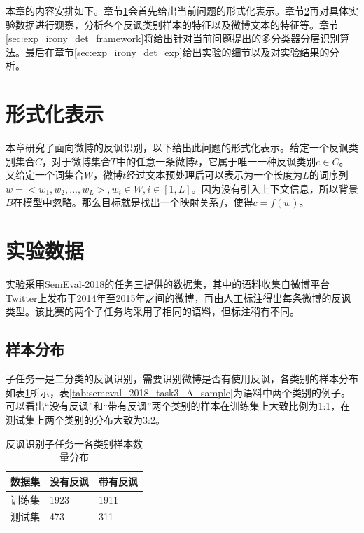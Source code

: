 本章的内容安排如下。章节\ref{sec:exp_irony_det_format}会首先给出当前问题的形式化表示。章节\ref{sec:exp_irony_det_data}再对具体实验数据进行观察，分析各个反讽类别样本的特征以及微博文本的特征等。章节\ref{sec:exp_irony_det_framework}将给出针对当前问题提出的多分类器分层识别算法。最后在章节\ref{sec:exp_irony_det_exp}给出实验的细节以及对实验结果的分析。

\section{形式化表示}
\label{sec:exp_irony_det_format}

本章研究了面向微博的反讽识别，以下给出此问题的形式化表示。给定一个反讽类别集合$C$，对于微博集合$T$中的任意一条微博$t$，它属于唯一一种反讽类别$c \in C$。又给定一个词集合$W$，微博$t$经过文本预处理后可以表示为一个长度为$L$的词序列 $w = <w_1, w_2, ..., w_L>, w_i \in W, i \in [1, L]$。因为没有引入上下文信息，所以背景$B$在模型中忽略。那么目标就是找出一个映射关系$f$，使得$c=f(w)$。

\section{实验数据}
\label{sec:exp_irony_det_data}

实验采用SemEval-2018的任务三提供的数据集，其中的语料收集自微博平台Twitter上发布于2014年至2015年之间的微博，再由人工标注得出每条微博的反讽类型。该比赛的两个子任务均采用了相同的语料，但标注稍有不同。

\subsection{样本分布}

子任务一是二分类的反讽识别，需要识别微博是否有使用反讽，各类别的样本分布如表\ref{tab:semeval_2018_task3_A_data}所示，表\ref{tab:semeval_2018_task3_A_sample}为语料中两个类别的例子。可以看出“没有反讽”和“带有反讽”两个类别的样本在训练集上大致比例为1:1，在测试集上两个类别的分布大致为3:2。

\begin{table}[htb]
  \centering
  \begin{minipage}[t]{0.7\linewidth} %
  \caption{反讽识别子任务一各类别样本数量分布}
  \label{tab:semeval_2018_task3_A_data}
    \begin{tabularx}{\linewidth}{X|XX}
    \toprule[1.5pt]
    数据集 & 没有反讽 & 带有反讽 \\  
    \hline
    训练集 & 1923 & 1911 \\
    测试集 & 473  & 311 \\
    \bottomrule[1.5pt]
    \end{tabularx}
  \end{minipage}
\end{table}

